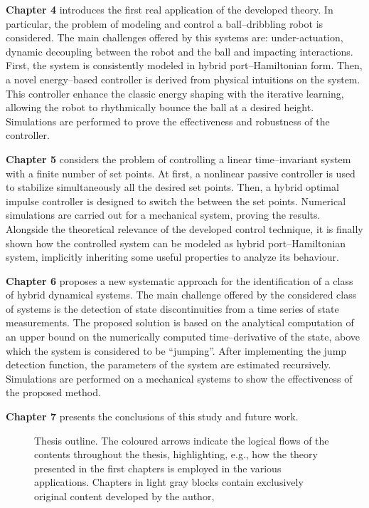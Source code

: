 %
\textbf{Chapter 4} introduces the first real application of the developed theory. In particular, the problem of modeling and control a ball--dribbling robot is considered. The main challenges offered by this systems are: under-actuation, dynamic decoupling between the robot and the ball and impacting interactions. First, the system is consistently modeled in hybrid port--Hamiltonian form. Then, a novel energy--based controller is derived from physical intuitions on the system. This controller enhance the classic energy shaping with the iterative learning, allowing the robot to rhythmically bounce the ball at a desired height. Simulations are performed to prove the effectiveness and robustness of the controller.   
%
\newline

%
\textbf{Chapter 5} considers the problem of controlling a linear time--invariant system with a finite number of set points. At first, a nonlinear passive controller is used to stabilize simultaneously all the desired set points. Then, a hybrid optimal impulse controller is designed to switch the between the set points. Numerical simulations are carried out for a mechanical system, proving the results. Alongside the theoretical relevance of the developed control technique, it is finally shown how the controlled system can be modeled as hybrid port--Hamiltonian system, implicitly inheriting some useful properties to analyze its behaviour.
%
\newline

%
\textbf{Chapter 6} proposes a new systematic approach for the identification of a class of hybrid dynamical systems. The main challenge offered by the considered class of systems is the detection of state discontinuities from a time series of state measurements. The proposed solution is based on the analytical computation of an upper bound on the numerically computed time--derivative of the state, above which the system is considered to be ``jumping''. After implementing the jump detection function, the parameters of the system are estimated recursively. Simulations are performed on a mechanical systems to show the effectiveness of the proposed method.
\newline

%
\textbf{Chapter 7} presents the conclusions of this study and future work.
%
\begin{figure}[b]
    \centering
    
    \vspace{5mm}
    \caption{Thesis outline. The coloured arrows indicate the logical flows of the contents throughout the thesis, highlighting, e.g., how the theory presented in the first chapters is employed in the various applications. Chapters in light gray blocks contain exclusively original content developed by the author,}
    \label{fig:ThesisStructure}
\end{figure}
%
%
%
